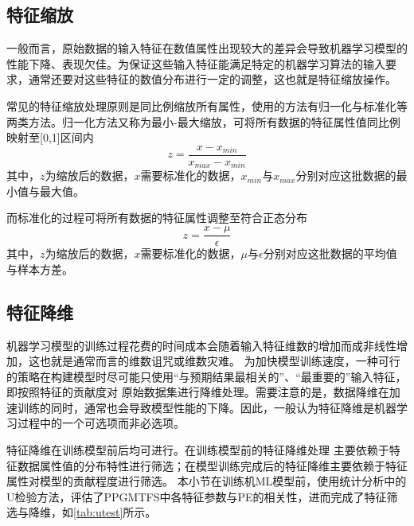 \subsection{特征缩放}
一般而言，原始数据的输入特征在数值属性出现较大的差异会导致机器学习模型的性能下降、表现欠佳\cite{Aurélien2018}。为保证这些输入特征能满足特定的机器学习算法的输入要求，通常还要对这些特征的数值分布进行一定的调整，这也就是特征缩放操作。

常见的特征缩放处理原则是同比例缩放所有属性，使用的方法有归一化与标准化等两类方法。归一化方法又称为最小-最大缩放，可将所有数据的特征属性值同比例映射至[0,1]区间内
\begin{equation}
  \label{equ:maxmin}
  z = \frac{x - x_{min}}{x_{max}-x_{min}}
\end{equation}
其中，$z$为缩放后的数据，$x$需要标准化的数据，$x_{min}$与$x_{max}$分别对应这批数据的最小值与最大值。

而标准化的过程可将所有数据的特征属性调整至符合正态分布
\begin{equation}
  \label{equ:normalization}
  z = \frac{x - \mu}{\epsilon}
\end{equation}
其中，$z$为缩放后的数据，$x$需要标准化的数据，$\mu$与$\epsilon$分别对应这批数据的平均值与样本方差。

\subsection{特征降维}
机器学习模型的训练过程花费的时间成本会随着输入特征维数的增加而成非线性增加，这也就是通常而言的维数诅咒或维数灾难。
为加快模型训练速度，一种可行的策略在构建模型时尽可能只使用“与预期结果最相关的”、“最重要的”输入特征，即按照特征的贡献度对
原始数据集进行降维处理。需要注意的是，数据降维在加速训练的同时，通常也会导致模型性能的下降。因此，一般认为特征降维是机器学习过程中的一个可选项而非必选项。

特征降维在训练模型前后均可进行。在训练模型前的特征降维处理
主要依赖于特征数据属性值的分布特性进行筛选；在模型训练完成后的特征降维主要依赖于特征属性对模型的贡献程度进行筛选。
本小节在训练机ML模型前，使用统计分析中的U检验方法，评估了PPGMTFS中各特征参数与PE的相关性，进而完成了特征筛选与降维，如\autoref{tab:utest}所示。

